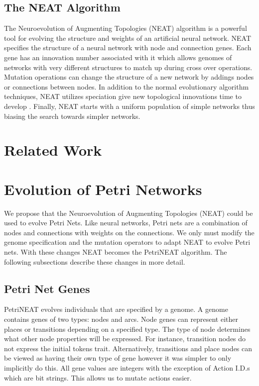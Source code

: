 \documentclass[12pt,a4paper,twocolumn]{article}
\begin{document}
\subsection{The NEAT Algorithm}

The Neuroevolution of Augmenting Topologies (NEAT) algorithm is a powerful tool for evolving the structure and weights of an artificial neural network. NEAT specifies the structure of a neural network with node and connection genes. Each gene has an innovation number associated with it which allows genomes of networks with very different structures to match up during cross over operations. Mutation operations can change the structure of a new network by addings nodes or connections between nodes. In addition to the normal evolutionary algorithm techniques, NEAT utilizes speciation give new topological innovations time to develop \cite{neat}. Finally, NEAT starts with a uniform population of simple networks thus biasing the search towards simpler networks.

\section{Related Work}



\section{Evolution of Petri Networks}

We propose that the Neuroevolution of Augmenting Topologies (NEAT) could be used to evolve Petri Nets. Like neural networks, Petri nets are a combination of nodes and connections with weights on the connections. We only must modify the genome specification and the mutation operators to adapt NEAT to evolve Petri nets. With these changes NEAT becomes the PetriNEAT algorithm. The following subsections describe these changes in more detail.

\subsection{Petri Net Genes}

PetriNEAT evolves individuals that are specified by a genome. A genome contains genes of two types: nodes and arcs. Node genes can represent either places or transitions depending on a specified type. The type of node determines what other node properties will be expressed. For instance, transition nodes do not express the initial tokens trait. Alternatively, transitions and place nodes can be viewed as having their own type of gene however it was simpler to only implicitly do this. All gene values are integers with the exception of Action I.D.s which are bit strings. This allows us to mutate actions easier.
\end{document}
